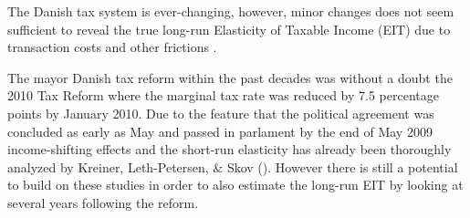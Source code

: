 The Danish tax system is ever-changing, however, minor changes does not seem sufficient to reveal the true long-run Elasticity of Taxable Income (EIT) due to transaction costs and other frictions \citep{chetty2011adjustment,kleven2014estimating}.

The mayor Danish tax reform within the past decades was without a doubt the 2010 Tax Reform where the marginal tax rate was reduced by 7.5 percentage points by January  2010. Due to the feature that the political agreement was concluded as early as May  and passed in parlament by the end of May 2009 income-shifting effects and the short-run elasticity has already been thoroughly analyzed by Kreiner, Leth-Petersen, \& Skov (\citeyear{kreiner2014year,kreiner2016tax}). However there is still a potential to build on these studies in order to also estimate the long-run EIT by looking at several years following the reform.
